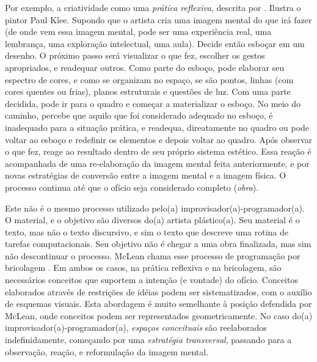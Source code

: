 
Por exemplo, a criatividade como uma \emph{prática reflexiva}, descrita por . Ilustra o pintor Paul Klee. Supondo que o artista cria uma imagem mental do que irá fazer (de onde vem essa imagem mental, pode ser uma experiência real, uma lembrança, uma exploração intelectual, uma aula). Decide então esboçar em um desenho. O próximo passo será visualizar o que fez, escolher os gestos apropriados, e readequar outros. Como parte do esboço, pode elaborar seu espectro de cores, e como se organizam no espaço, se são pontos, linhas (com cores quentes ou frias), planos estruturais e questões de luz. Com uma parte decidida, pode ir para o quadro e começar a materializar o esboço. No meio do caminho, percebe que aquilo que foi considerado adequado no esboço, é inadequado para a situação prática, e readequa, direatamente no quadro ou pode voltar ao esboço e redefinir os elementos e depois voltar ao quadro. Após observar o que fez, reage ao resultado dentro de seu próprio sistema estético. Essa reação é acompanhada de uma re-elaboração da imagem mental feita anteriormente, e por novas estratégias de conversão entre a imagem mental e a imagem física. O processo continua até que o ofício seja considerado completo (\emph{obra}). 

Este não é o mesmo processo utilizado pelo(a) improvisador(a)-programador(a). O material, e o objetivo são diversos do(a) artista plástico(a). Seu material é o texto, mas não o texto discursivo, e sim o texto que descreve uma rotina de tarefas computacionais. Seu objetivo não é chegar a uma obra finalizada, mas sim não descontinuar o processo. McLean chama esse processo de programação por bricolagem . Em ambos os casos, na prática reflexiva e na bricolagem, são necessários conceitos que suportem a intenção (e vontade) do ofício. Conceitos elaborados através de restrições de idéias podem ser sistematizados, com o auxílio de esquemas visuais. Esta abordagem é muito semelhante à posição defendida por McLean, onde conceitos podem ser representados geometricamente. No caso do(a) improvisador(a)-programador(a), \emph{espaços conceituais} são reelaborados indefinidamente, começando por uma \emph{estratégia transversal}, passando para a observação, reação, e reformulação da imagem mental.

